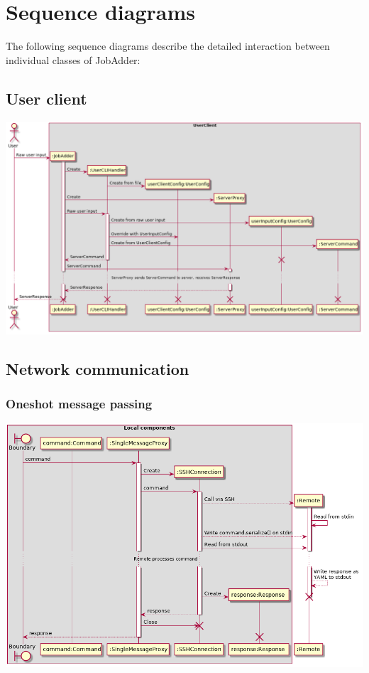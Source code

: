 \chapter{Sequence diagrams}
The following sequence diagrams describe the detailed interaction between individual classes of JobAdder:
    \section{User client}
        \includegraphics[width=\linewidth]{sequence/userclient-cli.png}
    \section{Network communication}
        \subsection{Oneshot message passing}
            \includegraphics[width=\linewidth]{sequence/proxy-one-message.png}
